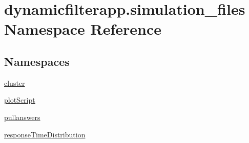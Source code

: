 \hypertarget{namespacedynamicfilterapp_1_1simulation__files}{}\section{dynamicfilterapp.\+simulation\+\_\+files Namespace Reference}
\label{namespacedynamicfilterapp_1_1simulation__files}
\subsection*{Namespaces}
\begin{DoxyCompactItemize}
\item 
 \mbox{\hyperlink{namespacedynamicfilterapp_1_1simulation__files_1_1cluster}{cluster}}
\item 
 \mbox{\hyperlink{namespacedynamicfilterapp_1_1simulation__files_1_1plot_script}{plot\+Script}}
\item 
 \mbox{\hyperlink{namespacedynamicfilterapp_1_1simulation__files_1_1pullanswers}{pullanswers}}
\item 
 \mbox{\hyperlink{namespacedynamicfilterapp_1_1simulation__files_1_1response_time_distribution}{response\+Time\+Distribution}}
\end{DoxyCompactItemize}
